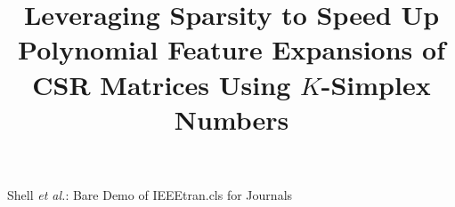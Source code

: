 \documentclass[journal]{journal}
\begin{document}
%
\title{Leveraging Sparsity to Speed Up Polynomial Feature Expansions of CSR Matrices Using $K$-Simplex Numbers}
%
%
%


% 
%



%
{Shell \MakeLowercase{\textit{et al.}}: Bare Demo of IEEEtran.cls for Journals}
% 
\end{document}
